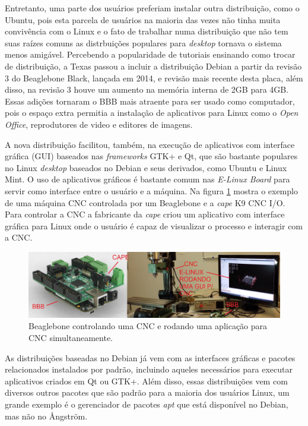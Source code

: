 Entretanto, uma parte dos usuários preferiam instalar outra distribuição, como o Ubuntu, pois esta parcela de usuários na maioria das vezes não tinha muita convivência com o Linux e o fato de trabalhar numa distribuição que não tem suas raízes comuns as distrbuições populares para \emph{desktop} tornava o sistema menos amigável. Percebendo a popularidade de tutoriais ensinando como trocar de distribuição, a Texas passou a incluir a distribuição Debian a partir da revisão 3 do Beaglebone Black, lançada em 2014, e revisão mais recente desta placa, além disso, na revisão 3 houve um aumento na memória interna de 2GB para 4GB. Essas adições tornaram o BBB mais atraente para ser usado como computador, pois o espaço extra permitia a instalação de aplicativos para Linux como o \emph{Open Office}, reprodutores de video e editores de imagens.

A nova distribuição facilitou, também, na execução de aplicativos com interface gráfica (GUI) baseados nas \emph{frameworks} GTK+ e Qt, que são bastante populares no Linux \emph{desktop} baseados no Debian e seus derivados, como Ubuntu e Linux Mint. O uso de aplicativos gráficos é bastante comum nas \emph{E-Linux Board} para servir como interface entre o usuário e a máquina. Na figura \ref{figura:bbb_cnc} mostra o exemplo de uma máquina CNC controlada por um Beaglebone e a \emph{cape} K9 CNC I/O. Para controlar a CNC a fabricante da \emph{cape} criou um aplicativo com interface gráfica para Linux onde o usuário é capaz de visualizar o processo e interagir com a CNC.

\begin{figure}[h]
	\centering
	\includegraphics[width=\textwidth]{figuras/cnc_cape.JPG}
	\caption{Beaglebone controlando uma CNC e rodando uma aplicação para CNC simultaneamente.\cite{guicncbbb}}
	\label{figura:bbb_cnc}
\end{figure}

As distribuições baseadas no Debian já vem com as interfaces gráficas e pacotes relacionados instalados por padrão, incluindo aqueles necessários para executar aplicativos criados em Qt ou GTK+. Além disso, essas distribuições vem com diversos outros pacotes que são padrão para a maioria dos usuários Linux, um grande exemplo é o gerenciador de pacotes \emph{apt} que está disponível no Debian, mas não no Ångström.

